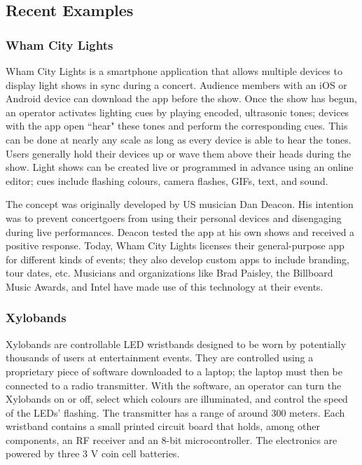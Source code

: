 \subsection{Recent Examples}

\subsubsection{Wham City Lights}

Wham City Lights is a smartphone application that allows multiple devices to display light shows in sync during a concert. Audience members with an iOS or Android device can download the app before the show. Once the show has begun, an operator activates lighting cues by playing encoded, ultrasonic tones; devices with the app open ``hear" these tones and perform the corresponding cues. This can be done at nearly any scale as long as every device is able to hear the tones. Users generally hold their devices up or wave them above their heads during the show. Light shows can be created live or programmed in advance using an online editor; cues include flashing colours, camera flashes, GIFs, text, and sound.

The concept was originally developed by US musician Dan Deacon. His intention was to prevent concertgoers from using their personal devices and disengaging during live performances. Deacon tested the app at his own shows and received a positive response. Today, Wham City Lights licenses their general-purpose app for different kinds of events; they also develop custom apps to include branding, tour dates, etc. Musicians and organizations like Brad Paisley, the Billboard Music Awards, and Intel have made use of this technology at their events.

\subsubsection{Xylobands}

Xylobands are controllable LED wristbands designed to be worn by potentially thousands of users at entertainment events. They are controlled using a proprietary piece of software downloaded to a laptop; the laptop must then be connected to a radio transmitter. With the software, an operator can turn the Xylobands on or off, select which colours are illuminated, and control the speed of the LEDs' flashing. The transmitter has a range of around 300 meters. Each wristband contains a small printed circuit board that holds, among other components, an RF receiver and an 8-bit microcontroller. The electronics are powered by three 3 V coin cell batteries.


